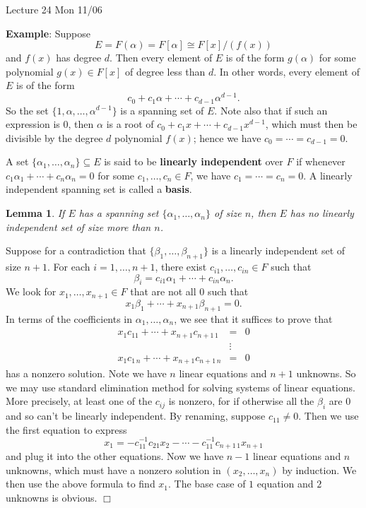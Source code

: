 \documentclass{article}
\newtheorem{lemma}[subsection]{Lemma}
\newenvironment{proof}{\noindent {\bf Proof:}}{$\Box$ \vspace{2 ex}}
\newcommand{\add}[1]{{\color{blue} #1}}
\begin{document}
\begin{center}
    \add{Lecture 24 Mon 11/06}
\end{center}

\vspace{5pt}
\noindent\textbf{Example}: Suppose $$E = F(\alpha) = F[\alpha] \cong F[x]/(f(x))$$ and $f(x)$ has degree $d$. Then every element of $E$ is of the form $g(\alpha)$ for some polynomial $g(x)\in F[x]$ of degree less than $d$. In other words, every element of $E$ is of the form $$c_0 + c_1\alpha + \cdots + c_{d-1}\alpha^{d-1}.$$
So the set $\{1,\alpha,\ldots,\alpha^{d-1}\}$ is a spanning set of $E$. Note also that if such an expression is $0$, then $\alpha$ is a root of $c_0 + c_1x + \cdots + c_{d-1}x^{d-1}$, which must then be divisible by the degree $d$ polynomial $f(x)$; hence we have $c_0 = \cdots = c_{d-1} = 0$. 

A set $\{\alpha_1,\ldots,\alpha_n\}\subseteq E$ is said to be \textbf{linearly independent} over $F$ if whenever $c_1\alpha_1 + \cdots + c_n\alpha_n = 0$ for some $c_1,\ldots,c_n\in F$, we have $c_1 = \cdots = c_n = 0.$ A linearly independent spanning set is called a \textbf{basis}.

\begin{lemma}\label{lem:span}
    If $E$ has a spanning set $\{\alpha_1,\ldots,\alpha_n\}$ of size $n$, then $E$ has no linearly independent set of size more than $n$.
\end{lemma}

\begin{proof}
    Suppose for a contradiction that $\{\beta_1,\ldots,\beta_{n+1}\}$ is a linearly independent set of size $n+1$. For each $i = 1,\ldots,n+1$, there exist $c_{i1},\ldots,c_{in}\in F$ such that $$\beta_i = c_{i1}\alpha_1 + \cdots + c_{in}\alpha_n.$$
    We look for $x_1,\ldots,x_{n+1}\in F$ that are not all $0$ such that $$x_1\beta_1 + \cdots + x_{n+1}\beta_{n+1} = 0.$$
    In terms of the coefficients in $\alpha_1,\ldots,\alpha_n$, we see that it suffices to prove that 
    \begin{eqnarray*}
        x_1c_{11} + \cdots + x_{n+1}c_{n+1\,1}&=&0\\
        &\vdots&\\
        x_1c_{1\,n} + \cdots + x_{n+1}c_{n+1\,n}&=&0
    \end{eqnarray*}
    has a nonzero solution. Note we have $n$ linear equations and $n+1$ unknowns. So we may use standard elimination method for solving systems of linear equations. More precisely, at least one of the $c_{ij}$ is nonzero, for if otherwise all the $\beta_i$ are $0$ and so can't be linearly independent. By renaming, suppose $c_{11}\neq 0$. Then we use the first equation to express $$x_1 = -c_{11}^{-1}c_{21}x_2 - \cdots -c_{11}^{-1}c_{n+1\,1}x_{n+1}$$ and plug it into the other equations. Now we have $n-1$ linear equations and $n$ unknowns, which must have a nonzero solution in $(x_2,\ldots,x_n)$ by induction. We then use the above formula to find $x_1$. The base case of $1$ equation and $2$ unknowns is obvious.
\end{proof}
\end{document}
